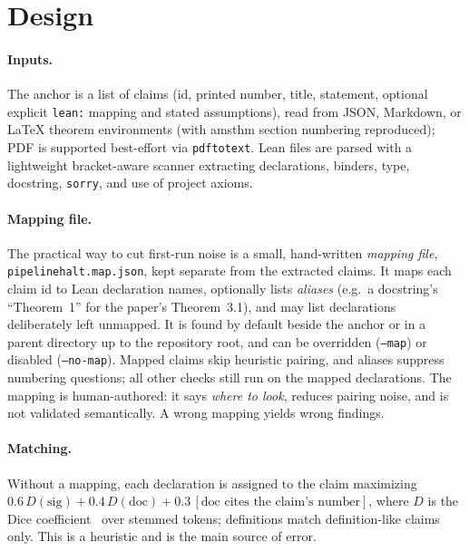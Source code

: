 \documentclass[11pt]{article}
\begin{document}
\section{Design}
\paragraph{Inputs.} The anchor is a list of claims (id, printed number, title, statement, optional explicit \texttt{lean:} mapping and stated assumptions), read from JSON, Markdown, or LaTeX theorem environments (with amsthm section numbering reproduced); PDF is supported best-effort via \texttt{pdftotext}. Lean files are parsed with a lightweight bracket-aware scanner extracting declarations, binders, type, docstring, \texttt{sorry}, and use of project axioms.

\paragraph{Mapping file.} The practical way to cut first-run noise is a small, hand-written \emph{mapping file}, \texttt{pipelinehalt.map.json}, kept separate from the extracted claims. It maps each claim id to Lean declaration names, optionally lists \emph{aliases} (e.g.\ a docstring's ``Theorem~1'' for the paper's Theorem~3.1), and may list declarations deliberately left unmapped. It is found by default beside the anchor or in a parent directory up to the repository root, and can be overridden (\texttt{--map}) or disabled (\texttt{--no-map}). Mapped claims skip heuristic pairing, and aliases suppress numbering questions; all other checks still run on the mapped declarations. The mapping is human-authored: it says \emph{where to look}, reduces pairing noise, and is not validated semantically. A wrong mapping yields wrong findings.

\paragraph{Matching.} Without a mapping, each declaration is assigned to the claim maximizing
$0.6\,D(\text{sig}) + 0.4\,D(\text{doc}) + 0.3\,[\text{doc cites the claim's number}]$,
where $D$ is the Dice coefficient~\cite{dice1945} over stemmed tokens; definitions match definition-like claims only. This is a heuristic and is the main source of error.
\end{document}
